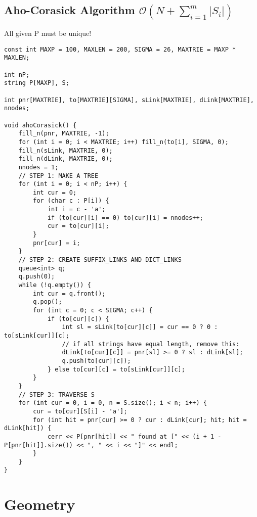\documentclass{article}
\begin{document}
\subsection{Aho-Corasick Algorithm $\mathcal{O}(N + \sum_{i=1}^{m} |S_i|)$}

All given P must be unique!

\begin{lstlisting}
const int MAXP = 100, MAXLEN = 200, SIGMA = 26, MAXTRIE = MAXP * MAXLEN;

int nP;
string P[MAXP], S;

int pnr[MAXTRIE], to[MAXTRIE][SIGMA], sLink[MAXTRIE], dLink[MAXTRIE], nnodes;

void ahoCorasick() {
	fill_n(pnr, MAXTRIE, -1);
	for (int i = 0; i < MAXTRIE; i++) fill_n(to[i], SIGMA, 0);
	fill_n(sLink, MAXTRIE, 0);
	fill_n(dLink, MAXTRIE, 0);
	nnodes = 1;
	// STEP 1: MAKE A TREE
	for (int i = 0; i < nP; i++) {
		int cur = 0;
		for (char c : P[i]) {
			int i = c - 'a';
			if (to[cur][i] == 0) to[cur][i] = nnodes++;
			cur = to[cur][i];
		}
		pnr[cur] = i;
	}
	// STEP 2: CREATE SUFFIX_LINKS AND DICT_LINKS
	queue<int> q;
	q.push(0);
	while (!q.empty()) {
		int cur = q.front();
		q.pop();
		for (int c = 0; c < SIGMA; c++) {
			if (to[cur][c]) {
				int sl = sLink[to[cur][c]] = cur == 0 ? 0 : to[sLink[cur]][c];
				// if all strings have equal length, remove this:
				dLink[to[cur][c]] = pnr[sl] >= 0 ? sl : dLink[sl];
				q.push(to[cur][c]);
			} else to[cur][c] = to[sLink[cur]][c];
		}
	}
	// STEP 3: TRAVERSE S
	for (int cur = 0, i = 0, n = S.size(); i < n; i++) {
		cur = to[cur][S[i] - 'a'];
		for (int hit = pnr[cur] >= 0 ? cur : dLink[cur]; hit; hit = dLink[hit]) {
			cerr << P[pnr[hit]] << " found at [" << (i + 1 - P[pnr[hit]].size()) << ", " << i << "]" << endl;
		}
	}
}
\end{lstlisting}

\section{Geometry}
\end{document}
